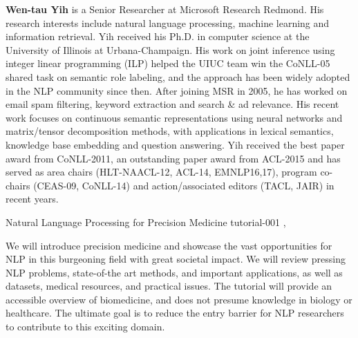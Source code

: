 \begin{bio}
  {\bfseries Wen-tau Yih} is a Senior Researcher at Microsoft Research Redmond. His research interests include natural language processing, machine learning and information retrieval. Yih received his Ph.D. in computer science at the University of Illinois at Urbana-Champaign. His work on joint inference using integer linear programming (ILP) helped the UIUC team win the CoNLL-05 shared task on semantic role labeling, and the approach has been widely adopted in the NLP community since then. After joining MSR in 2005, he has worked on email spam filtering, keyword extraction and search \& ad relevance. His recent work focuses on continuous semantic representations using neural networks and matrix/tensor decomposition methods, with applications in lexical semantics, knowledge base embedding and question answering. Yih received the best paper award from CoNLL-2011, an outstanding paper award from ACL-2015 and has served as area chairs (HLT-NAACL-12, ACL-14, EMNLP16,17), program co-chairs (CEAS-09, CoNLL-14) and action/associated editors (TACL, JAIR) in recent years.

\end{bio}

\begin{tutorial}
  {Natural Language Processing for Precision Medicine}
  {tutorial-001}
  {\daydateyear, \tutorialmorningtime}
  {\TutLocA}

We will introduce precision medicine and showcase the vast opportunities for NLP in this burgeoning field with great societal impact. We will review pressing NLP problems, state-of-the art methods, and important applications, as well as datasets, medical resources, and practical issues. The tutorial will provide an accessible overview of biomedicine, and does not presume knowledge in biology or healthcare. The ultimate goal is to reduce the entry barrier for NLP researchers to contribute to this exciting domain.
\end{tutorial}
